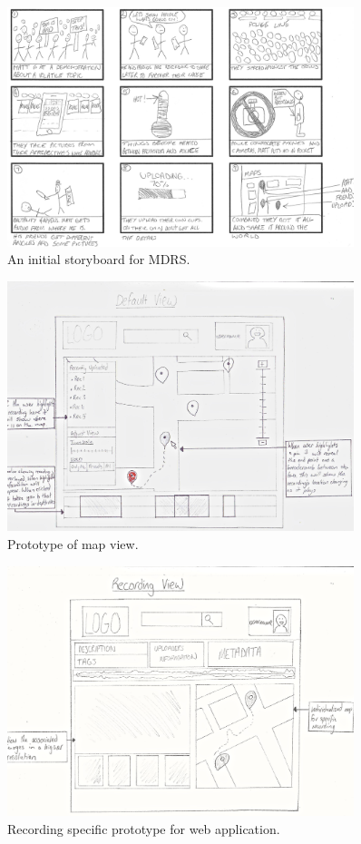 \documentclass{l3proj}
\begin{document}
\newpage
\begin{figure}[ht!]
\centering
\includegraphics[angle=270, width=0.9\textwidth]{images/ally-storyboard.jpg}
\caption{An initial storyboard for MDRS.}
\end{figure}

\newpage
\begin{figure}[ht!]
\centering
\includegraphics[angle=270, width=0.9\textwidth]{images/web-map-view.jpg}
\caption{Prototype of map view.}
\end{figure}

\newpage
\begin{figure}[ht!]
\centering
\includegraphics[angle=270, width=0.9\textwidth]{images/web-recording-view.jpg}
\caption{Recording specific prototype for web application.}
\end{figure}
\end{document}
